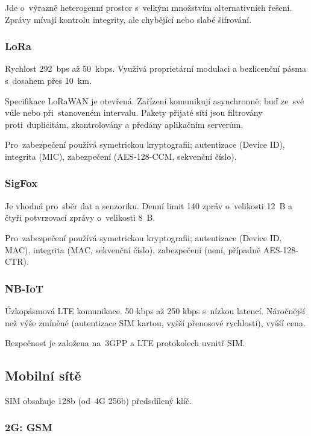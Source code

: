 Jde o~výrazně heterogenní prostor s~velkým množstvím alternativních řešení.
Zprávy mívají kontrolu integrity, ale chybějící nebo slabé šifrování.


\subsubsection{LoRa}

Rychlost 292~bps až 50~kbps.
Využívá proprietární modulaci a bezlicenční pásma s~dosahem přes 10~km.

Specifikace LoRaWAN je otevřená.
Zařízení komunikují asynchronně; buď ze~své vůle nebo při~stanoveném intervalu.
Pakety přijaté sítí jsou filtrovány proti~duplicitám, zkontrolovány a předány aplikačním serverům.

Pro~zabezpečení používá symetrickou kryptografii; autentizace (Device ID), integrita (MIC), zabezpečení (AES-128-CCM, sekvenční číslo).


\subsubsection{SigFox}


Je vhodná pro~sběr dat a senzoriku.
Denní limit 140 zpráv o~velikosti 12~B a čtyři potvrzovací zprávy o~velikosti 8~B.

Pro~zabezpečení používá symetrickou kryptografii; autentizace (Device ID, MAC), integrita (MAC, sekvenční číslo), zabezpečení (není, případně AES-128-CTR).


\subsubsection{NB-IoT}

Úzkopásmová LTE komunikace.
50 kbps až 250 kbps s~nízkou latencí.
Náročnější než výše zmíněné (autentizace SIM kartou, vyšší přenosové rychlosti), vyšší cena.

Bezpečnost je založena na~3GPP a LTE protokolech uvnitř SIM.


\subsection{Mobilní sítě}

SIM obsahuje 128b (od~4G 256b) předsdílený klíč.



\subsubsection{2G: GSM}


